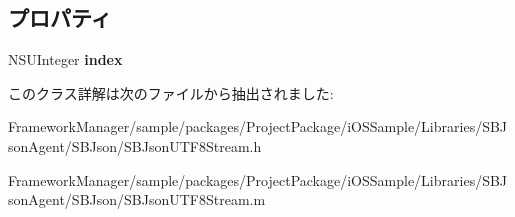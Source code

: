 \subsection*{プロパティ}
\begin{DoxyCompactItemize}
\item 
\hypertarget{interface_s_b_json_u_t_f8_stream_ac1851614a43a1be306e1804f8008e473}{}N\+S\+U\+Integer {\bfseries index}\label{interface_s_b_json_u_t_f8_stream_ac1851614a43a1be306e1804f8008e473}

\end{DoxyCompactItemize}


このクラス詳解は次のファイルから抽出されました\+:\begin{DoxyCompactItemize}
\item 
Framework\+Manager/sample/packages/\+Project\+Package/i\+O\+S\+Sample/\+Libraries/\+S\+B\+Json\+Agent/\+S\+B\+Json/S\+B\+Json\+U\+T\+F8\+Stream.\+h\item 
Framework\+Manager/sample/packages/\+Project\+Package/i\+O\+S\+Sample/\+Libraries/\+S\+B\+Json\+Agent/\+S\+B\+Json/S\+B\+Json\+U\+T\+F8\+Stream.\+m\end{DoxyCompactItemize}
